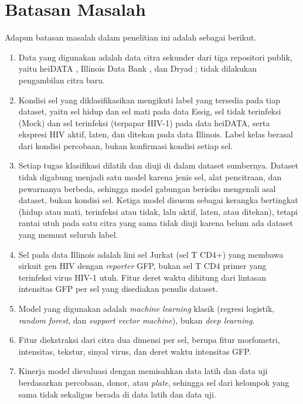 \section{Batasan Masalah}\label{batasan-masalah}

Adapun batasan masalah dalam penelitian ini adalah sebagai berikut.

\begin{enumerate}
  \item Data yang digunakan adalah data citra sekunder dari tiga repositori publik, yaitu heiDATA \cite{ananth2024dataset}, Illinois Data Bank \cite{lu2022dataset}, dan Dryad \cite{essig2022dataset}; tidak dilakukan pengambilan citra baru.
  \item Kondisi sel yang diklasifikasikan mengikuti label yang tersedia pada tiap dataset, yaitu sel hidup dan sel mati pada data Essig, sel tidak terinfeksi (Mock) dan sel terinfeksi (terpapar HIV-1) pada data heiDATA, serta ekspresi HIV aktif, laten, dan ditekan pada data Illinois. Label kelas berasal dari kondisi percobaan, bukan konfirmasi kondisi setiap sel.
  \item Setiap tugas klasifikasi dilatih dan diuji di dalam dataset sumbernya. Dataset tidak digabung menjadi satu model karena jenis sel, alat pencitraan, dan pewarnanya berbeda, sehingga model gabungan berisiko mengenali asal dataset, bukan kondisi sel. Ketiga model disusun sebagai kerangka bertingkat (hidup atau mati, terinfeksi atau tidak, lalu aktif, laten, atau ditekan), tetapi rantai utuh pada satu citra yang sama tidak diuji karena belum ada dataset yang memuat seluruh label.
  \item Sel pada data Illinois adalah lini sel Jurkat (sel T CD4+) yang membawa sirkuit gen HIV dengan \textit{reporter} GFP, bukan sel T CD4 primer yang terinfeksi virus HIV-1 utuh. Fitur deret waktu dihitung dari lintasan intensitas GFP per sel yang disediakan penulis dataset.
  \item Model yang digunakan adalah \textit{machine learning} klasik (regresi logistik, \textit{random forest}, dan \textit{support vector machine}), bukan \textit{deep learning}.
  \item Fitur diekstraksi dari citra dua dimensi per sel, berupa fitur morfometri, intensitas, tekstur, sinyal virus, dan deret waktu intensitas GFP.
  \item Kinerja model dievaluasi dengan memisahkan data latih dan data uji berdasarkan percobaan, donor, atau \textit{plate}, sehingga sel dari kelompok yang sama tidak sekaligus berada di data latih dan data uji.
\end{enumerate}

